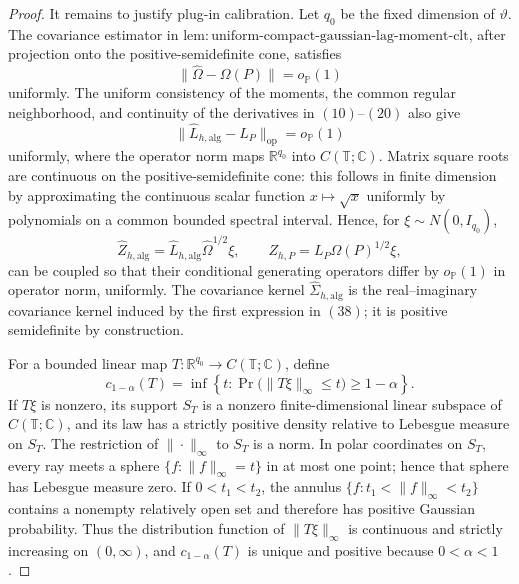 \documentclass{article}
\begin{document}
\begin{proof}
It remains to justify plug-in calibration.  Let \(q_0\) be the fixed dimension of \(\vartheta\).  The covariance estimator in \(\mathrm{lem{:}uniform\mbox{-}compact\mbox{-}gaussian\mbox{-}lag\mbox{-}moment\mbox{-}clt}\), after projection onto the positive-semidefinite cone, satisfies
\[
 \|\widehat\Omega-\Omega(P)\|=o_{\mathbb P}(1)
\tag{36}
\]
uniformly.  The uniform consistency of the moments, the common regular neighborhood, and continuity of the derivatives in \((10)\)--\((20)\) also give
\[
 \|\widehat L_{h,\mathrm{alg}}-L_P\|_{\mathrm{op}}
 =o_{\mathbb P}(1)
\tag{37}
\]
uniformly, where the operator norm maps \(\mathbb R^{q_0}\) into \(C(\mathbb T;\mathbb C)\).  Matrix square roots are continuous on the positive-semidefinite cone: this follows in finite dimension by approximating the continuous scalar function \(x\mapsto\sqrt x\) uniformly by polynomials on a common bounded spectral interval.  Hence, for \(\xi\sim N(0,I_{q_0})\),
\[
 \widehat Z_{h,\mathrm{alg}}
 =\widehat L_{h,\mathrm{alg}}\widehat\Omega^{1/2}\xi,
 \qquad
 Z_{h,P}=L_P\Omega(P)^{1/2}\xi,
\tag{38}
\]
can be coupled so that their conditional generating operators differ by \(o_{\mathbb P}(1)\) in operator norm, uniformly.  The covariance kernel \(\widehat\Sigma_{h,\mathrm{alg}}\) is the real--imaginary covariance kernel induced by the first expression in \((38)\); it is positive semidefinite by construction.

For a bounded linear map \(T:\mathbb R^{q_0}\to C(\mathbb T;\mathbb C)\), define
\[
 c_{1-\alpha}(T)
 =\inf\left\{t:
 \Pr\bigl(\|T\xi\|_\infty\le t\bigr)\ge1-\alpha
 \right\}.
\tag{39}
\]
If \(T\xi\) is nonzero, its support \(S_T\) is a nonzero finite-dimensional linear subspace of \(C(\mathbb T;\mathbb C)\), and its law has a strictly positive density relative to Lebesgue measure on \(S_T\).  The restriction of \(\|\cdot\|_\infty\) to \(S_T\) is a norm.  In polar coordinates on \(S_T\), every ray meets a sphere \(\{f:\|f\|_\infty=t\}\) in at most one point; hence that sphere has Lebesgue measure zero.  If \(0<t_1<t_2\), the annulus \(\{f:t_1<\|f\|_\infty<t_2\}\) contains a nonempty relatively open set and therefore has positive Gaussian probability.  Thus the distribution function of \(\|T\xi\|_\infty\) is continuous and strictly increasing on \((0,\infty)\), and \(c_{1-\alpha}(T)\) is unique and positive because \(0<\alpha<1\).


\end{proof}
\end{document}
